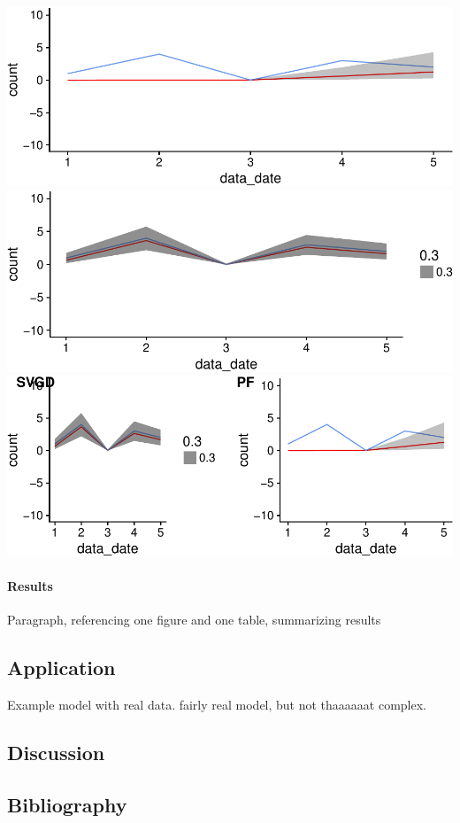 \documentclass[]{article}
\let\oldparagraph\paragraph
\renewcommand{\paragraph}[1]{\oldparagraph{#1}\mbox{}}
\begin{document}
\includegraphics{ssvgd_files/figure-latex/unnamed-chunk-4-1.pdf}
\includegraphics{ssvgd_files/figure-latex/unnamed-chunk-4-2.pdf}
\includegraphics{ssvgd_files/figure-latex/unnamed-chunk-4-3.pdf}

\paragraph{Results}\label{results}

Paragraph, referencing one figure and one table, summarizing results

\subsection{Application}\label{application}

Example model with real data. fairly real model, but not thaaaaaat
complex.

\subsection{Discussion}\label{discussion}

\subsection{Bibliography}\label{bibliography}
\end{document}
